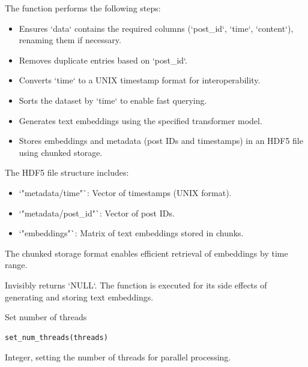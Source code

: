 \documentclass[a4paper]{book}
\begin{document}
\begin{Details}
The function performs the following steps:
\begin{itemize}

\item{} Ensures `data` contains the required columns (`post\_id`, `time`, `content`), renaming them if necessary.
\item{} Removes duplicate entries based on `post\_id`.
\item{} Converts `time` to a UNIX timestamp format for interoperability.
\item{} Sorts the dataset by `time` to enable fast querying.
\item{} Generates text embeddings using the specified transformer model.
\item{} Stores embeddings and metadata (post IDs and timestamps) in an HDF5 file using chunked storage.

\end{itemize}


The HDF5 file structure includes:
\begin{itemize}

\item{} `"metadata/time"`: Vector of timestamps (UNIX format).
\item{} `"metadata/post\_id"`: Vector of post IDs.
\item{} `"embeddings"`: Matrix of text embeddings stored in chunks.

\end{itemize}


The chunked storage format enables efficient retrieval of embeddings by time range.
\end{Details}
%
\begin{Value}
Invisibly returns `NULL`. The function is executed for its side effects of generating 
and storing text embeddings.
\end{Value}
%
\begin{Description}
Set number of threads
\end{Description}
%
\begin{Usage}
\begin{verbatim}
set_num_threads(threads)
\end{verbatim}
\end{Usage}
%
\begin{Arguments}
\begin{ldescription}
\item[\code{threads}] Integer, setting the number of threads for parallel processing.
\end{ldescription}
\end{Arguments}
\end{document}
